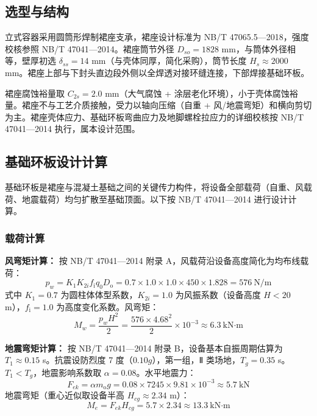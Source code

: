 \subsection{选型与结构}

立式容器采用圆筒形焊制裙座支承，裙座设计标准为 NB/T 47065.5—2018\cite{nbt47065-2018}，强度校核参照 NB/T 47041—2014\cite{nbt47041-2014}。裙座筒节外径 $D_{so} = 1828$ mm，与筒体外径相等，壁厚初选 $\delta_{ss} = 14$ mm（与壳体同厚，简化采购），筒节长度 $H_s \approx 2000$ mm。裙座上部与下封头直边段外侧以全焊透对接环缝连接，下部焊接基础环板。

裙座腐蚀裕量取 $C_{2s} = 2.0$ mm（大气腐蚀 + 涂层老化环境），小于壳体腐蚀裕量。裙座不与工艺介质接触，受力以轴向压缩（自重 + 风/地震弯矩）和横向剪切为主。裙座壳体应力、基础环板弯曲应力及地脚螺栓拉应力的详细校核按 NB/T 47041—2014 执行\cite{nbt47041-2014}，属本设计范围。

\subsection{基础环板设计计算}

基础环板是裙座与混凝土基础之间的关键传力构件，将设备全部载荷（自重、风载荷、地震载荷）均匀扩散至基础顶面。以下按 NB/T 47041—2014 进行设计计算。

\subsubsection{载荷计算}


\textbf{风弯矩计算：} 按 NB/T 47041—2014 附录 A，风载荷沿设备高度简化为均布线载荷：
\begin{equation}
p_w = K_1 K_{2i} f_{\mathrm{i}} q_0 D_{\mathrm{o}} = 0.7 \times 1.0 \times 1.0 \times 450 \times 1.828 = 576\ \text{N/m}
\end{equation}
式中 $K_1=0.7$ 为圆柱体体型系数，$K_{2i}=1.0$ 为风振系数（设备高度 $H<20$ m），$f_{\mathrm{i}}=1.0$ 为高度变化系数。风弯矩：
\begin{equation}
M_w = \frac{p_w H^2}{2} = \frac{576 \times 4.68^2}{2} \times 10^{-3} \approx 6.3\ \text{kN·m}
\end{equation}

\textbf{地震弯矩计算：} 按 NB/T 47041—2014 附录 B，设备基本自振周期估算为 $T_1 \approx 0.15$ s。抗震设防烈度 7 度（$0.10g$），第一组，Ⅱ 类场地，$T_g = 0.35$ s。$T_1 < T_g$，地震影响系数取 $\alpha = 0.08$。水平地震力：
\begin{equation}
F_{ek} = \alpha m_{\mathrm{o}} g = 0.08 \times 7245 \times 9.81 \times 10^{-3} \approx 5.7\ \text{kN}
\end{equation}
地震弯矩（重心近似取设备半高 $H_{cg} \approx 2.34$ m）：
\begin{equation}
M_e = F_{ek} H_{cg} = 5.7 \times 2.34 \approx 13.3\ \text{kN·m}
\end{equation}

